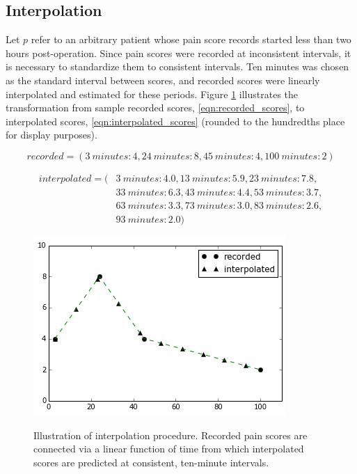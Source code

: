 \subsection{Interpolation}
Let $p$ refer to an arbitrary patient whose pain score records started less than two hours post-operation. Since pain scores were recorded at inconsistent intervals, it is necessary to standardize them to consistent intervals. Ten minutes was chosen as the standard interval between scores, and recorded scores were linearly interpolated  and estimated for these periods. Figure \ref{fig:interpolation} illustrates the transformation from sample recorded scores, \eqref{eqn:recorded_scores}, to interpolated scores, \eqref{eqn:interpolated_scores} (rounded to the hundredths place for display purposes).

\begin{equation}\label{eqn:recorded_scores}
    recorded=(3\ minutes: 4, 24\ minutes: 8, 45\ minutes: 4, 100\ minutes: 2)
\end{equation}

\begin{equation}\label{eqn:interpolated_scores}
\begin{split}
    interpolated=(&3\ minutes:4.0, 13\ minutes:5.9, 23\ minutes:7.8,\\
                  &33\ minutes:6.3, 43\ minutes:4.4, 53\ minutes:3.7,\\
                  &63\ minutes:3.3, 73\ minutes:3.0, 83\ minutes:2.6,\\
                  &93\ minutes:2.0)
\end{split}
\end{equation}

\begin{figure}[h]
  \includegraphics[scale=0.4]{./Figures/interpolation.png}\\
  \caption{Illustration of interpolation procedure. Recorded pain scores are connected via a linear function of time from which interpolated scores are predicted at consistent, ten-minute intervals.}\label{fig:interpolation}
\end{figure}

